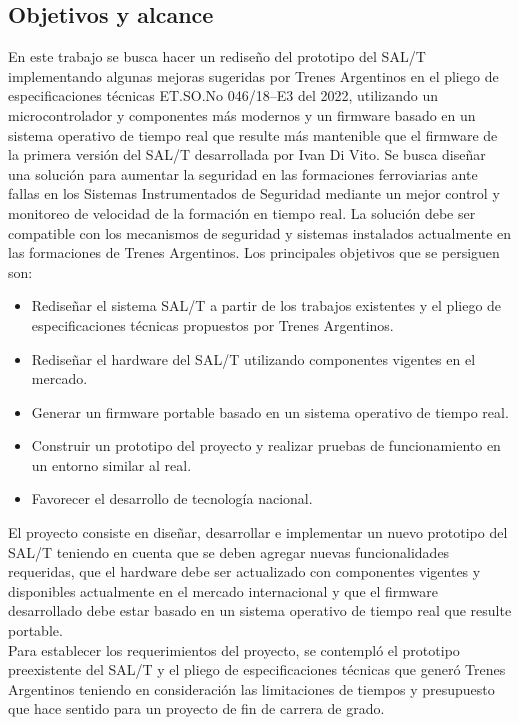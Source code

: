 \subsection{Objetivos y alcance}

En este trabajo se busca hacer un rediseño del prototipo del SAL/T implementando algunas mejoras sugeridas por Trenes Argentinos en el pliego de especificaciones técnicas ET.SO.No 046/18–E3 \cite{spec} del 2022, utilizando un microcontrolador y componentes más modernos y un firmware basado en un sistema operativo de tiempo real que resulte más mantenible que el firmware de la primera versión del SAL/T desarrollada por Ivan Di Vito. Se busca diseñar una solución para aumentar la seguridad en las formaciones ferroviarias ante fallas en los Sistemas Instrumentados de Seguridad mediante un mejor control y monitoreo de velocidad de la formación en tiempo real. La solución debe ser compatible con los mecanismos de seguridad y sistemas instalados actualmente en las formaciones de Trenes Argentinos. Los principales objetivos que se persiguen son:


\begin{itemize}
    \item Rediseñar el sistema SAL/T a partir de los trabajos existentes y el pliego de especificaciones técnicas propuestos por Trenes Argentinos.
    \item Rediseñar el hardware del SAL/T utilizando componentes vigentes en el mercado.
    \item Generar un firmware portable basado en un sistema operativo de tiempo real.
    \item Construir un prototipo del proyecto y realizar pruebas de funcionamiento en un entorno similar al real.
    \item Favorecer el desarrollo de tecnología nacional.
\end{itemize}


El proyecto consiste en diseñar, desarrollar e implementar un nuevo prototipo del SAL/T teniendo en cuenta que se deben agregar nuevas funcionalidades requeridas, que el hardware debe ser actualizado con componentes vigentes y disponibles actualmente en el mercado internacional y que el firmware desarrollado debe estar basado en un sistema operativo de tiempo real que resulte portable. \\

Para establecer los requerimientos del proyecto, se contempló el prototipo preexistente del SAL/T y el pliego de especificaciones técnicas que generó Trenes Argentinos \cite{spec} teniendo en consideración las limitaciones de tiempos y presupuesto que hace sentido para un proyecto de fin de carrera de grado. \\

